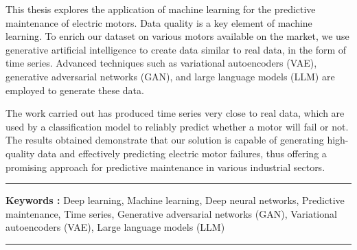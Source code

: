 \medskip

This thesis explores the application of machine learning for the predictive maintenance of 
electric motors. Data quality is a key element of machine learning. To enrich our dataset on 
various motors available on the market, we use generative artificial intelligence to create 
data similar to real data, in the form of time series. Advanced techniques such as variational 
autoencoders (VAE), generative adversarial networks (GAN), and large language models (LLM) 
are employed to generate these data.

\medskip

The work carried out has produced time series very close to real data, which are used by a 
classification model to reliably predict whether a motor will fail or not. The results 
obtained demonstrate that our solution is capable of generating high-quality data and effectively
predicting electric motor failures, thus offering a promising approach for predictive
maintenance in various industrial sectors.

\vspace{1cm}



\noindent\rule[2pt]{\textwidth}{0.5pt}

{\textbf{Keywords :}}
Deep learning, Machine learning, Deep neural networks, Predictive maintenance, 
Time series, Generative adversarial networks (GAN), Variational autoencoders (VAE), Large language models (LLM)
\\


\noindent\rule[2pt]{\textwidth}{0.5pt}






